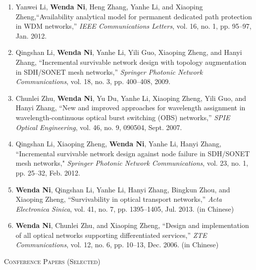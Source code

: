 \documentclass[letterpaper,11pt]{article}
\newcommand{\resheading}[1]{{\noindent\large \colorbox{mygrey}{
\begin{minipage}{1.0\textwidth}{\textsc{#1 \vphantom{p\^{E}}}}\end{minipage}}}}
\begin{document}
\begin{enumerate}
\item
Yanwei Li, \textbf{Wenda Ni}, Heng Zhang, Yanhe Li, and Xiaoping Zheng,``Availability analytical model for permanent dedicated path protection in WDM networks,'' \textit{IEEE Communications Letters}, vol. 16, no. 1, pp. 95--97, Jan. 2012.

\item
Qingshan Li, \textbf{Wenda Ni}, Yanhe Li, Yili Guo, Xiaoping Zheng, and Hanyi Zhang, ``Incremental survivable network design with topology augmentation in SDH/SONET mesh networks,'' \textit{Springer Photonic Network Communications}, vol. 18, no. 3, pp. 400--408,
2009.

\item
Chunlei Zhu, \textbf{Wenda Ni}, Yu Du, Yanhe Li, Xiaoping Zheng, Yili Guo, and Hanyi Zhang, ``New and improved approaches for wavelength assignment in wavelength-continuous optical burst switching (OBS) networks,'' \textit{SPIE Optical Engineering}, vol. 46, no. 9, 090504, Sept. 2007.

\item
Qingshan Li, Xiaoping Zheng, \textbf{Wenda Ni}, Yanhe Li, Hanyi Zhang, ``Incremental survivable network design against node failure in SDH/SONET mesh networks," \textit{Springer Photonic Network Communications}, vol. 23, no. 1, pp. 25--32, Feb. 2012.

\item
\textbf{Wenda Ni}, Qingshan Li, Yanhe Li, Hanyi Zhang, Bingkun Zhou, and Xiaoping Zheng, ``Survivability in optical transport networks,'' \textit{Acta Electronica Sinica}, vol. 41, no. 7, pp. 1395--1405, Jul. 2013. (in Chinese)

\item
\textbf{Wenda Ni}, Chunlei Zhu, and Xiaoping Zheng, ``Design and implementation of all optical networks supporting differentiated services,'' \textit{ZTE Communications}, vol. 12, no. 6, pp. 10--13, Dec. 2006. (in Chinese)
\end{enumerate}




\resheading{Conference Papers (Selected)}%
\end{document}

